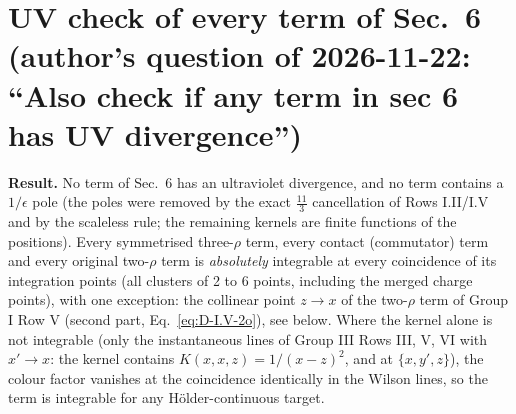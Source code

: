 \documentclass[9pt]{article}
\numberwithin{equation}{section}
\begin{document}
{\color{red}\section*{UV check of every term of Sec.~6 (author's question of 2026-11-22: ``Also check if any term in sec 6 has UV divergence'')}\label{sec:chk-UV}}
\noindent\textbf{Result.} No term of Sec.~6 has an ultraviolet divergence, and no term contains a $1/\epsilon$ pole (the poles were removed by the exact $\frac{11}{3}$ cancellation of Rows I.II/I.V and by the scaleless rule; the remaining kernels are finite functions of the positions). Every symmetrised three-$\rho$ term, every contact (commutator) term and every original two-$\rho$ term is \emph{absolutely} integrable at every coincidence of its integration points (all clusters of 2 to 6 points, including the merged charge points), with one exception: the collinear point $z\to x$ of the two-$\rho$ term of Group I Row V (second part, Eq.~\eqref{eq:D-I.V-2o}), see below. Where the kernel alone is not integrable (only the instantaneous lines of Group III Rows III, V, VI with $x'\to x$: the kernel contains $K(x,x,z)=1/(x-z)^2$, and at $\{x,y',z\}$), the colour factor vanishes at the coincidence identically in the Wilson lines, so the term is integrable for any H\"older-continuous target.
\end{document}
